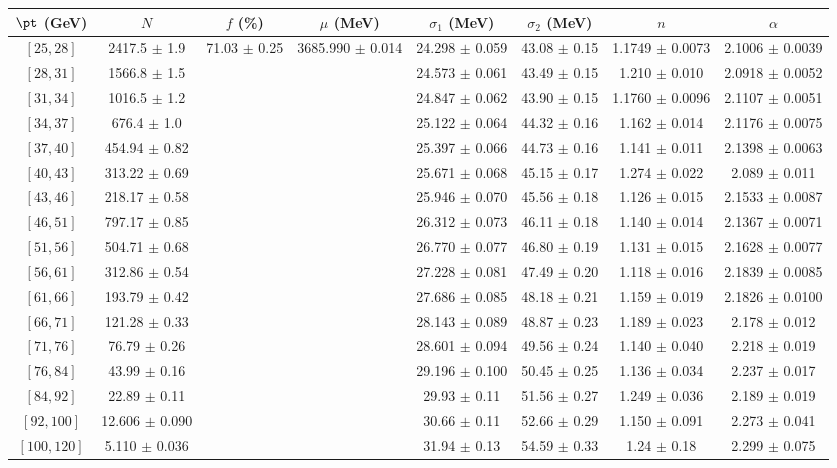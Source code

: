 \begin{tabular}{c||c|c|c|c|c|c|c}
$\pt$ (GeV) & $N$ & $f$ (\%) & $\mu$ (MeV) & $\sigma_1$ (MeV) & $\sigma_2$ (MeV) & $n$ & $\alpha$ \\
\hline
$[25, 28]$ & 2417.5 $\pm$ 1.9 & \multirow{17}{*}{71.03 $\pm$ 0.25} & \multirow{17}{*}{3685.990 $\pm$ 0.014} & 24.298 $\pm$ 0.059 & 43.08 $\pm$ 0.15 & 1.1749 $\pm$ 0.0073 & 2.1006 $\pm$ 0.0039\\
$[28, 31]$ & 1566.8 $\pm$ 1.5 &  &  & 24.573 $\pm$ 0.061 & 43.49 $\pm$ 0.15 & 1.210 $\pm$ 0.010 & 2.0918 $\pm$ 0.0052\\
$[31, 34]$ & 1016.5 $\pm$ 1.2 &  &  & 24.847 $\pm$ 0.062 & 43.90 $\pm$ 0.15 & 1.1760 $\pm$ 0.0096 & 2.1107 $\pm$ 0.0051\\
$[34, 37]$ & 676.4 $\pm$ 1.0 &  &  & 25.122 $\pm$ 0.064 & 44.32 $\pm$ 0.16 & 1.162 $\pm$ 0.014 & 2.1176 $\pm$ 0.0075\\
$[37, 40]$ & 454.94 $\pm$ 0.82 &  &  & 25.397 $\pm$ 0.066 & 44.73 $\pm$ 0.16 & 1.141 $\pm$ 0.011 & 2.1398 $\pm$ 0.0063\\
$[40, 43]$ & 313.22 $\pm$ 0.69 &  &  & 25.671 $\pm$ 0.068 & 45.15 $\pm$ 0.17 & 1.274 $\pm$ 0.022 & 2.089 $\pm$ 0.011\\
$[43, 46]$ & 218.17 $\pm$ 0.58 &  &  & 25.946 $\pm$ 0.070 & 45.56 $\pm$ 0.18 & 1.126 $\pm$ 0.015 & 2.1533 $\pm$ 0.0087\\
$[46, 51]$ & 797.17 $\pm$ 0.85 &  &  & 26.312 $\pm$ 0.073 & 46.11 $\pm$ 0.18 & 1.140 $\pm$ 0.014 & 2.1367 $\pm$ 0.0071\\
$[51, 56]$ & 504.71 $\pm$ 0.68 &  &  & 26.770 $\pm$ 0.077 & 46.80 $\pm$ 0.19 & 1.131 $\pm$ 0.015 & 2.1628 $\pm$ 0.0077\\
$[56, 61]$ & 312.86 $\pm$ 0.54 &  &  & 27.228 $\pm$ 0.081 & 47.49 $\pm$ 0.20 & 1.118 $\pm$ 0.016 & 2.1839 $\pm$ 0.0085\\
$[61, 66]$ & 193.79 $\pm$ 0.42 &  &  & 27.686 $\pm$ 0.085 & 48.18 $\pm$ 0.21 & 1.159 $\pm$ 0.019 & 2.1826 $\pm$ 0.0100\\
$[66, 71]$ & 121.28 $\pm$ 0.33 &  &  & 28.143 $\pm$ 0.089 & 48.87 $\pm$ 0.23 & 1.189 $\pm$ 0.023 & 2.178 $\pm$ 0.012\\
$[71, 76]$ & 76.79 $\pm$ 0.26 &  &  & 28.601 $\pm$ 0.094 & 49.56 $\pm$ 0.24 & 1.140 $\pm$ 0.040 & 2.218 $\pm$ 0.019\\
$[76, 84]$ & 43.99 $\pm$ 0.16 &  &  & 29.196 $\pm$ 0.100 & 50.45 $\pm$ 0.25 & 1.136 $\pm$ 0.034 & 2.237 $\pm$ 0.017\\
$[84, 92]$ & 22.89 $\pm$ 0.11 &  &  & 29.93 $\pm$ 0.11 & 51.56 $\pm$ 0.27 & 1.249 $\pm$ 0.036 & 2.189 $\pm$ 0.019\\
$[92, 100]$ & 12.606 $\pm$ 0.090 &  &  & 30.66 $\pm$ 0.11 & 52.66 $\pm$ 0.29 & 1.150 $\pm$ 0.091 & 2.273 $\pm$ 0.041\\
$[100, 120]$ & 5.110 $\pm$ 0.036 &  &  & 31.94 $\pm$ 0.13 & 54.59 $\pm$ 0.33 & 1.24 $\pm$ 0.18 & 2.299 $\pm$ 0.075\\
\end{tabular}
